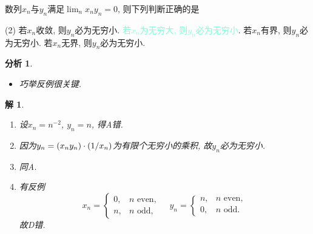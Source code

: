 \documentclass[a4paper, 12pt]{ctexart}
\theoremstyle{plain}
\theoremstyle{nonumberplain}
\newtheorem{solution}{解}
\theoremstyle{nonumberplain}
\newtheorem{analysis}{分析}
\theoremstyle{nonumberplain}
\newcommand{\ans}[1]{\textcolor{Aquamarine}{#1}}
\begin{document}
    \begin{problem}
        数列$x_n$与$y_n$满足$\lim_n x_ny_n=0$, 则下列判断正确的是
        \begin{tasks}(2)
            \task 若$x_n$收敛, 则$y_n$必为无穷小.
            \task[\ans{(B)}] \ans{若$x_n$为无穷大, 则$y_n$必为无穷小}.
            \task 若$x_n$有界, 则$y_n$必为无穷小.
            \task 若$x_n$无界, 则$y_n$必为无穷小.
        \end{tasks}
    \end{problem}
    \begin{analysis}
        \begin{itemize}
            \item 巧举反例很关键.
        \end{itemize}
    \end{analysis}
    \begin{solution}\hspace{\fill}
        \begin{enumerate}[\hspace{2em}A:]
            \item 设$x_n=n^{-2}$, $y_n=n$, 得A错.
            \item 因为$y_n=(x_ny_n)\cdot\left(1\middle/x_n\right)$为有限个无穷小的乘积, 故$y_n$必为无穷小.
            \item 同A.
            \item 有反例
            \begin{equation}
                x_n=
                \begin{cases}
                    0, &n \text{ even},\\
                    n, &n \text{ odd},
                \end{cases}
                \quad
                y_n=
                \begin{cases}
                    n, &n \text{ even},\\
                    0, &n \text{ odd}.
                \end{cases}
            \end{equation}
            故D错.
        \end{enumerate}
    \end{solution}
\end{document}
